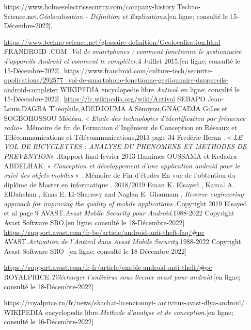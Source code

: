 \documentclass[a4paper, 12pt]{article}
\begin{document}
\begin{thebibliography}{9}
\url{https://www.holmeselectricsecurity.com/company-history}
Techno-Science.net.\textit{Géolocalisation - Définition et Explications}.[en ligne; consulté le 15-Décembre-2022].

\url{https://www.techno-science.net/glossaire-definition/Geolocalisation.html}
FRANDROID .COM .\textit{Vol de smartphones : comment fonctionne le gestionnaire d’appareils Android et comment le compléter},4 Juillet 2015.[en ligne; consulté le 15-Décembre-2022].
\url{https://www.frandroid.com/culture-tech/securite-applications/292577_vol-de-smartphone-fonctionne-gestionnaire-dappareils-android-completer}
WIKIPEDIA encyclopedie libre.\textit{Antivol}.[en ligne; consulté le 15-Décembre-2022].
\url{https://fr.wikipedia.org/wiki/Antivol}
SEBAPO Jean-Louis,DAGBA Théophile,ADEDJOUMA A.Sèmiyou,GNACADJA Gilles et SOGBOHOSSOU Médésu. « \textit{Etude des technologies d’identification par fréquence radio}». Mémoire de fin de Formation d’Ingénieur de Conception en Réseaux et Télécommunications et Télécommunications,2013 page 34
Fredéric Heran . « \textit{LE VOL DE BICYCLETTES : ANALYSE DU PHENOMENE ET METHODES DE PREVENTION}» .Rapport final fevrier 2013
Hamimes OUSSAMA et Kedadra ABDELHAK. « \textit{ Conception et développement d’une application android pour le suivi des objets mobiles} » . Mémoire de Fin d’études En vue de l’obtention du diplôme de Master en informatique . 2018/2019
Eman K. Elsayed , Kamal A. ElDahshan , Enas E. El-Sharawy and Naglaa E. Ghannam .\textit{ Reverse engineering approach for improving the quality of mobile applications }.Copyright 2019 Elsayed et al page 9 
AVAST.\textit{Avast Mobile Security pour Android}.1988-2022 Copyright Avast Software SRO.[en ligne; consulté le 18-Décembre-2022]
\url{https://support.avast.com/fr-be/article/android-anti-theft-faq/#pc}
AVAST.\textit{Activation de l'Antivol dans Avast Mobile Security}.1988-2022 Copyright Avast Software SRO .[en ligne; consulté le 18-Décembre-2022]

\url{https://support.avast.com/fr-fr/article/enable-android-anti-theft/#pc}
ROYALPRICE.\textit{Télécharger l'antivirus sous licence avast pour android}.[en ligne; consulté le 18-Décembre-2022]

\url{https://royalprice.ru/fr/news/skachat-licenzionnyi-

antivirus-avast-dlya-android/}
WIKIPEDIA encyclopedie libre.\textit{Methode d'analyse et de conception}.[en ligne; consulté le 16-Décembre-2022]


\end{thebibliography}
\end{document}

